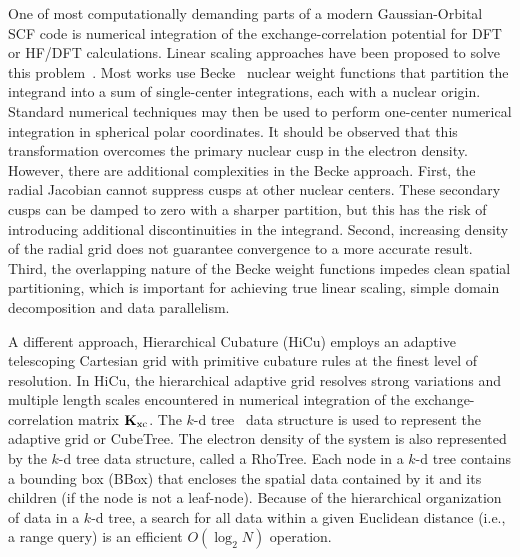 \commentoutA{\documentclass[prl,aps,twocolumn,showpacs,twocolumngrid,superbib]{revtex4}}
\newcommand{\Kxc}{{\bf K}_{\mathrm{xc}}}
\begin{document}
One of most computationally demanding parts of a modern
Gaussian-Orbital SCF code is numerical integration of the
exchange-correlation potential for DFT or HF/DFT calculations. Linear
scaling approaches have been proposed to solve this 
problem~\cite{Jorda95,RStratmann96,CGuerra98,MChallacombe00A}.  Most
works use Becke~\cite{Becke88} nuclear weight functions that
partition the integrand into a sum of single-center integrations, each
with a nuclear origin.  Standard numerical techniques may then be
used to perform one-center numerical integration in spherical polar
coordinates.  It should be observed that this transformation 
overcomes the primary nuclear cusp in the electron density.  However, there 
are additional complexities in the Becke approach.  First, the radial Jacobian cannot 
suppress cusps at other nuclear centers.  These secondary cusps can 
be damped to zero with a sharper partition, but this has the risk of   
introducing additional discontinuities in the integrand.  Second, increasing 
density of the radial grid does not guarantee convergence to a 
more accurate result.  Third, the overlapping nature of the Becke weight functions 
impedes clean spatial partitioning, which is important for achieving true 
linear scaling, simple domain decomposition and data parallelism.

A different approach, Hierarchical Cubature (HiCu) employs an adaptive
telescoping Cartesian grid with primitive cubature rules at the finest
level of resolution\cite{MChallacombe00A}.  In HiCu, the hierarchical
adaptive grid resolves strong variations and multiple length scales
encountered in numerical integration of the exchange-correlation
matrix $\Kxc$.  The $k$-d tree~\cite{Bentley79,Bentley80,Gaede98} data
structure is used to represent the adaptive grid or CubeTree. The
electron density of the system is also represented by the $k$-d tree
data structure, called a RhoTree.  Each node in a $k$-d tree contains
a bounding box (BBox) that encloses the spatial data contained by it
and its children (if the node is not a leaf-node).  Because of the
hierarchical organization of data in a $k$-d tree, a search for all
data within a given Euclidean distance (i.e., a range query) is an
efficient $O(\log_{2}N)$ operation.
\end{document}

